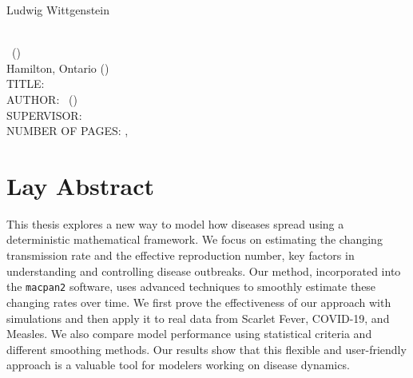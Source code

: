 \documentclass[
11pt, %
oneside, %
english, %
singlespacing, %
]{macthesis} %
\def\blankpage{%
      \clearpage%
      \thispagestyle{empty}%
      \addtocounter{page}{-1}%
      \null%
      \clearpage}
\begin{document}
\hfill\textemdash Ludwig Wittgenstein

\blankpage
\clearpage




\blankpage
\clearpage


\newpage
{} %
\setcounter{page}{2} %

\noindent %
\univname \\
\degreename\, (\the\year) \\
Hamilton, Ontario (\deptname) \\[1.5cm]
TITLE: \ttitle \\
AUTHOR: \authorname\,  %
(\univname)  \\
SUPERVISOR: \supname\, \\
NUMBER OF PAGES: \pageref{lastoffront}, \pageref{LastPage}  %

\clearpage

\section*{Lay Abstract}
  This thesis explores a new way to model how diseases spread using a deterministic mathematical framework. We focus on estimating the changing transmission rate and the effective reproduction number, key factors in understanding and controlling disease outbreaks. Our method, incorporated into the \texttt{macpan2} software, uses advanced techniques to smoothly estimate these changing rates over time. We first prove the effectiveness of our approach with simulations and then apply it to real data from Scarlet Fever, COVID-19, and Measles. We also compare model performance using statistical criteria and different smoothing methods. Our results show that this flexible and user-friendly approach is a valuable tool for modelers working on disease dynamics.
\blankpage
\clearpage
\end{document}
